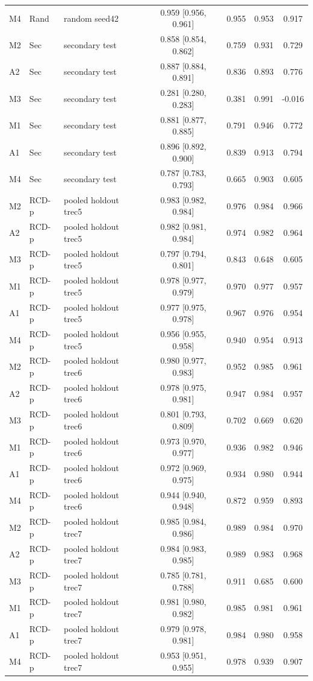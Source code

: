 \documentclass[conference]{IEEEtran}
\begin{document}
\begin{table}[!htbp]
\begin{tabular}{lllcccc}
M4 & Rand & random seed42 & 0.959 [0.956, 0.961] & 0.955 & 0.953 & 0.917 \\
M2 & Sec & secondary test & 0.858 [0.854, 0.862] & 0.759 & 0.931 & 0.729 \\
A2 & Sec & secondary test & 0.887 [0.884, 0.891] & 0.836 & 0.893 & 0.776 \\
M3 & Sec & secondary test & 0.281 [0.280, 0.283] & 0.381 & 0.991 & -0.016 \\
M1 & Sec & secondary test & 0.881 [0.877, 0.885] & 0.791 & 0.946 & 0.772 \\
A1 & Sec & secondary test & 0.896 [0.892, 0.900] & 0.839 & 0.913 & 0.794 \\
M4 & Sec & secondary test & 0.787 [0.783, 0.793] & 0.665 & 0.903 & 0.605 \\
M2 & RCD-p & pooled holdout trec5 & 0.983 [0.982, 0.984] & 0.976 & 0.984 & 0.966 \\
A2 & RCD-p & pooled holdout trec5 & 0.982 [0.981, 0.984] & 0.974 & 0.982 & 0.964 \\
M3 & RCD-p & pooled holdout trec5 & 0.797 [0.794, 0.801] & 0.843 & 0.648 & 0.605 \\
M1 & RCD-p & pooled holdout trec5 & 0.978 [0.977, 0.979] & 0.970 & 0.977 & 0.957 \\
A1 & RCD-p & pooled holdout trec5 & 0.977 [0.975, 0.978] & 0.967 & 0.976 & 0.954 \\
M4 & RCD-p & pooled holdout trec5 & 0.956 [0.955, 0.958] & 0.940 & 0.954 & 0.913 \\
M2 & RCD-p & pooled holdout trec6 & 0.980 [0.977, 0.983] & 0.952 & 0.985 & 0.961 \\
A2 & RCD-p & pooled holdout trec6 & 0.978 [0.975, 0.981] & 0.947 & 0.984 & 0.957 \\
M3 & RCD-p & pooled holdout trec6 & 0.801 [0.793, 0.809] & 0.702 & 0.669 & 0.620 \\
M1 & RCD-p & pooled holdout trec6 & 0.973 [0.970, 0.977] & 0.936 & 0.982 & 0.946 \\
A1 & RCD-p & pooled holdout trec6 & 0.972 [0.969, 0.975] & 0.934 & 0.980 & 0.944 \\
M4 & RCD-p & pooled holdout trec6 & 0.944 [0.940, 0.948] & 0.872 & 0.959 & 0.893 \\
M2 & RCD-p & pooled holdout trec7 & 0.985 [0.984, 0.986] & 0.989 & 0.984 & 0.970 \\
A2 & RCD-p & pooled holdout trec7 & 0.984 [0.983, 0.985] & 0.989 & 0.983 & 0.968 \\
M3 & RCD-p & pooled holdout trec7 & 0.785 [0.781, 0.788] & 0.911 & 0.685 & 0.600 \\
M1 & RCD-p & pooled holdout trec7 & 0.981 [0.980, 0.982] & 0.985 & 0.981 & 0.961 \\
A1 & RCD-p & pooled holdout trec7 & 0.979 [0.978, 0.981] & 0.984 & 0.980 & 0.958 \\
M4 & RCD-p & pooled holdout trec7 & 0.953 [0.951, 0.955] & 0.978 & 0.939 & 0.907 \\
\hline\hline
\end{tabular}
\end{table}
\end{document}
